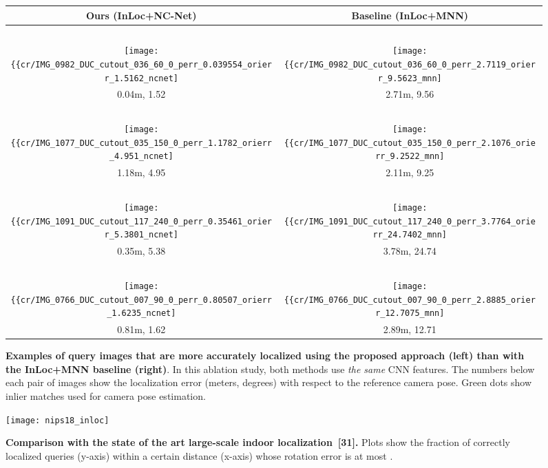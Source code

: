 \documentclass{article}
\begin{document}
\begin{figure}[tbp]
  \centering
  \begingroup
  \renewcommand{\arraystretch}{0.5}
  \begin{tabular}{@{\hskip 1pt}c@{\hskip 6pt}|@{\hskip 6pt}c@{\hskip 1pt}}
    Ours (InLoc+NC-Net) & Baseline (InLoc+MNN) \\ \hline
     ~ & ~ \\ 
    \texttt{[image: \{\{cr/IMG\_0982\_DUC\_cutout\_036\_60\_0\_perr\_0.039554\_orierr\_1.5162\_ncnet]}}} &    \texttt{[image: \{\{cr/IMG\_0982\_DUC\_cutout\_036\_60\_0\_perr\_2.7119\_orierr\_9.5623\_mnn]}}} \\
    0.04m, 1.52 & 2.71m, 9.56 \\ \hline
    ~ & ~ \\ 
    \texttt{[image: \{\{cr/IMG\_1077\_DUC\_cutout\_035\_150\_0\_perr\_1.1782\_orierr\_4.951\_ncnet]}}} &    \texttt{[image: \{\{cr/IMG\_1077\_DUC\_cutout\_035\_150\_0\_perr\_2.1076\_orierr\_9.2522\_mnn]}}} \\
    1.18m, 4.95 & 2.11m, 9.25 \\ \hline
    ~ & ~ \\ 
    \texttt{[image: \{\{cr/IMG\_1091\_DUC\_cutout\_117\_240\_0\_perr\_0.35461\_orierr\_5.3801\_ncnet]}}} &    \texttt{[image: \{\{cr/IMG\_1091\_DUC\_cutout\_117\_240\_0\_perr\_3.7764\_orierr\_24.7402\_mnn]}}} \\
    0.35m, 5.38 & 3.78m, 24.74 \\ \hline
    ~ & ~ \\ 
    \texttt{[image: \{\{cr/IMG\_0766\_DUC\_cutout\_007\_90\_0\_perr\_0.80507\_orierr\_1.6235\_ncnet]}}} &    \texttt{[image: \{\{cr/IMG\_0766\_DUC\_cutout\_007\_90\_0\_perr\_2.8885\_orierr\_12.7075\_mnn]}}} \\
    0.81m, 1.62 & 2.89m, 12.71 
  \end{tabular}
  \endgroup
  \vspace{2pt}
  \caption{{\bf Examples of query images that are more accurately localized using the proposed approach (left) than with the InLoc+MNN baseline (right)}. In this ablation study, both methods use \emph{the same} CNN features. The numbers below each pair of images show the localization error (meters, degrees) with respect to the reference camera pose. Green dots show inlier matches used for camera pose estimation.}
  \label{fig:densePV_MNN}
\end{figure}

\begin{figure}[t]
    \centering
    \texttt{[image: nips18\_inloc]}
    \caption{{\bf Comparison with the state of the art large-scale indoor localization~[31].} Plots show the fraction of correctly localized queries (y-axis) within a certain distance (x-axis) whose rotation error is at most  . }
    \label{fig:inloc-curves}
\end{figure}
\end{document}

